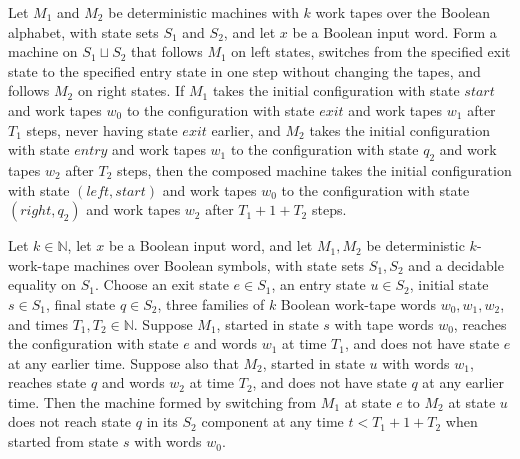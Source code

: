 \begin{theorem}
\label{Turing.seamCompTM_run}
\leanok
{}
Let $M_1$ and $M_2$ be deterministic machines with $k$ work tapes over the Boolean
alphabet, with state sets $S_1$ and $S_2$, and let $x$ be a Boolean input word. Form a
machine on $S_1\sqcup S_2$ that follows $M_1$ on left states, switches from the
specified exit state to the specified entry state in one step without changing the
tapes, and follows $M_2$ on right states. If $M_1$ takes the initial configuration with
state $start$ and work tapes $w_0$ to the configuration with state $exit$ and work tapes
$w_1$ after $T_1$ steps, never having state $exit$ earlier, and $M_2$ takes the initial
configuration with state $entry$ and work tapes $w_1$ to the configuration with state
$q_2$ and work tapes $w_2$ after $T_2$ steps, then the composed machine takes the
initial configuration with state $(left,start)$ and work tapes $w_0$ to the
configuration with state $(right,q_2)$ and work tapes $w_2$ after $T_1+1+T_2$ steps.
\end{theorem}

\begin{theorem}
\label{Turing.seamCompTM_firstReturn}
\leanok
{}
Let $k\in\mathbb N$, let $x$ be a Boolean input word, and let $M_1,M_2$ be deterministic
$k$-work-tape machines over Boolean symbols, with state sets $S_1,S_2$ and a decidable
equality on $S_1$. Choose an exit state $e\in S_1$, an entry state $u\in S_2$, initial
state $s\in S_1$, final state $q\in S_2$, three families of $k$ Boolean work-tape words
$w_0,w_1,w_2$, and times $T_1,T_2\in\mathbb N$. Suppose $M_1$, started in state $s$ with
tape words $w_0$, reaches the configuration with state $e$ and words $w_1$ at time
$T_1$, and does not have state $e$ at any earlier time. Suppose also that $M_2$, started
in state $u$ with words $w_1$, reaches state $q$ and words $w_2$ at time $T_2$, and does
not have state $q$ at any earlier time. Then the machine formed by switching from $M_1$
at state $e$ to $M_2$ at state $u$ does not reach state $q$ in its $S_2$ component at
any time $t<T_1+1+T_2$ when started from state $s$ with words $w_0$.
\end{theorem}

